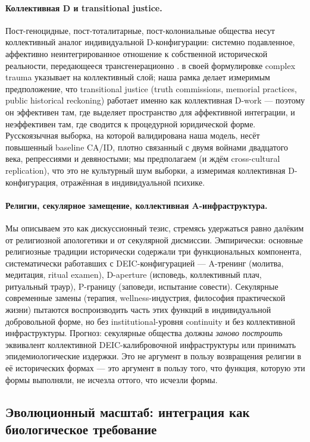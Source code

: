 \paragraph{Коллективная D и transitional justice.} Пост-геноцидные, пост-тоталитарные, пост-колониальные общества несут коллективный аналог индивидуальной D-конфигурации: системно подавленное, аффективно неинтегрированное отношение к собственной исторической реальности, передающееся трансгенерационно \citep{yehuda2015, meaney2001}. \citet{herman1992} в своей формулировке complex trauma указывает на коллективный слой; наша рамка делает измеримым предположение, что transitional justice (truth commissions, memorial practices, public historical reckoning) работает именно как коллективная D-work --- поэтому он эффективен там, где выделяет пространство для аффективной интеграции, и неэффективен там, где сводится к процедурной юридической форме. Русскоязычная выборка, на которой валидирована наша модель, несёт повышенный baseline CA/ID, плотно связанный с двумя войнами двадцатого века, репрессиями и девяностыми; мы предполагаем (и ждём cross-cultural replication), что это не культурный шум выборки, а измеримая коллективная D-конфигурация, отражённая в индивидуальной психике.

\paragraph{Религии, секулярное замещение, коллективная A-инфраструктура.} Мы описываем это как дискуссионный тезис, стремясь удержаться равно далёким от религиозной апологетики и от секулярной дисмиссии. Эмпирически: основные религиозные традиции исторически содержали три функциональных компонента, систематически работавших с DEIC-конфигурацией --- A-тренинг (молитва, медитация, ritual examen), D-aperture (исповедь, коллективный плач, ритуальный траур), P-границу (заповеди, испытание совести). Секулярные современные замены (терапия, wellness-индустрия, философия практической жизни) пытаются воспроизводить часть этих функций в индивидуальной добровольной форме, но без institutional-уровня continuity и без коллективной инфраструктуры. Прогноз: секулярные общества должны \emph{заново построить} эквивалент коллективной DEIC-калибровочной инфраструктуры или принимать эпидемиологические издержки. Это не аргумент в пользу возвращения религии в её исторических формах --- это аргумент в пользу того, что функция, которую эти формы выполняли, не исчезла оттого, что исчезли формы.

\subsection{Эволюционный масштаб: интеграция как биологическое требование}
\label{subsec:evolutionary}

